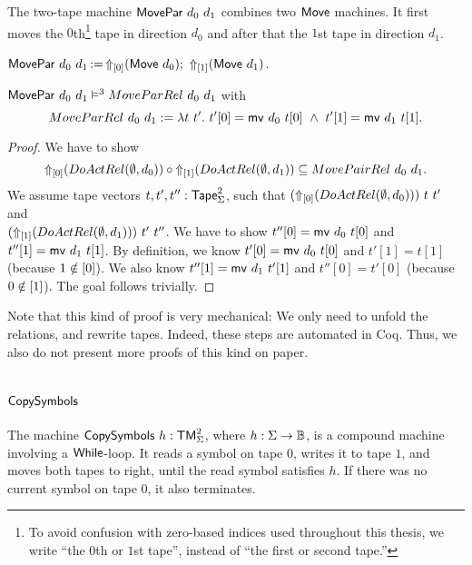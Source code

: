 The two-tape machine $\MS{MovePar}~d_0~d_1$ combines two $\MS{Move}$ machines.  It first moves the $0$th\footnote{To avoid confusion with zero-based
  indices used throughout this thesis, we write ``the $0$th or $1$st tape'', instead of ``the first or second tape.''} tape in direction $d_0$ and
after that the $1$st tape in direction $d_1$.
\begin{definition}[$\MS{MovePar}$][MovePar]
  \label{def:MovePar}
  $\MS{MovePar}~d_0~d_1 \defop \LiftTapes{(\MS{Move}~d_0)}{\Vector{0}} \Seq \LiftTapes{(\MS{Move}~d_1)}{\Vector{1}}$.
\end{definition}
\begin{lemma}
  \label{lem:MovePar_Sem}
  $\MS{MovePar}~d_0~d_1 \RealiseIn3 MoveParRel~d_0~d_1$ with
  \[ MoveParRel~d_0~d_1 := \lambda t~t'.~t'[0]=\MS{mv}~d_0~t[0] ~\land~ t'[1]=\MS{mv}~d_1~t[1]. \]
\end{lemma}
\begin{proof}
  We have to show
  $$
    \LiftTapes{(DoActRel(\None,d_0))}{\Vector{0}} \circ
    \LiftTapes{(DoActRel(\None,d_1))}{\Vector{1}} \subseteq
    MovePairRel~d_0~d_1.
  $$
  We assume tape vectors $t, t', t'' : \Tape_\Sigma^2$, such that $(\LiftTapes{(DoActRel(\None,d_0))}{\Vector{0}})~t~t'$ and \\
  $(\LiftTapes{(DoActRel(\None,d_1))}{\Vector{1}})~t'~t''$.  We have to show $t''[0]=\MS{mv}~d_0~t[0]$ and $t''[1]=\MS{mv}~d_1~t[1]$.  By definition,
  we know $t'[0]=\MS{mv}~d_0~t[0]$ and $t'[1]=t[1]$ (because $1 \notin \Vector{0}$).  We also know $t''[1]=\MS{mv}~d_1~t'[1]$ and $t''[0]=t'[0]$
  (because $0 \notin \Vector{1}$).  The goal follows trivially.
\end{proof}
Note that this kind of proof is very mechanical: We only need to unfold the relations, and rewrite tapes.  Indeed, these steps are automated in Coq.
Thus, we also do not present more proofs of this kind on paper.

\section{$\MS{CopySymbols}$}
\label{sec:CopySymbols}
%

The machine $\MS{CopySymbols}~h : \TM_\Sigma^2$, where $h:\Sigma\to\Bool$, is a compound machine involving a $\While$-loop.  It reads a symbol on tape
$0$, writes it to tape $1$, and moves both tapes to right, until the read symbol satisfies $h$.  If there was no current symbol on tape $0$, it also
terminates.

